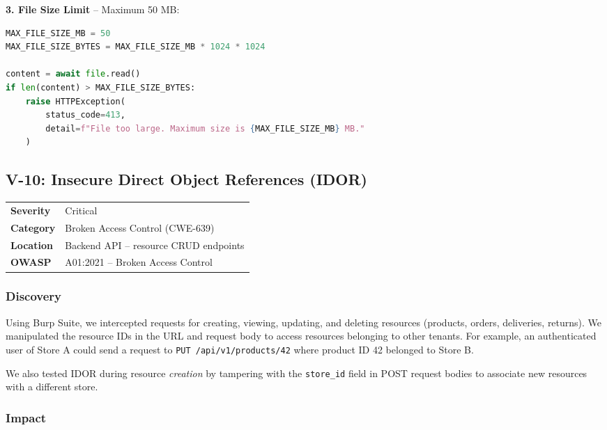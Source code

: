 \documentclass[12pt,a4paper]{article}
\begin{document}
\textbf{3. File Size Limit} -- Maximum 50 MB:

\begin{lstlisting}[language=Python, caption={File size enforcement}]
MAX_FILE_SIZE_MB = 50
MAX_FILE_SIZE_BYTES = MAX_FILE_SIZE_MB * 1024 * 1024

content = await file.read()
if len(content) > MAX_FILE_SIZE_BYTES:
    raise HTTPException(
        status_code=413,
        detail=f"File too large. Maximum size is {MAX_FILE_SIZE_MB} MB."
    )
\end{lstlisting}

\subsection{V-10: Insecure Direct Object References (IDOR)}

\begin{table}[H]
\centering
\begin{tabularx}{\textwidth}{lX}
\toprule
\textbf{Severity} & \textcolor{critical}{Critical} \\
\textbf{Category} & Broken Access Control (CWE-639) \\
\textbf{Location} & Backend API -- resource CRUD endpoints \\
\textbf{OWASP} & A01:2021 -- Broken Access Control \\
\bottomrule
\end{tabularx}
\end{table}

\subsubsection{Discovery}

Using Burp Suite, we intercepted requests for creating, viewing, updating, and deleting resources (products, orders, deliveries, returns). We manipulated the resource IDs in the URL and request body to access resources belonging to other tenants. For example, an authenticated user of Store A could send a request to \texttt{PUT /api/v1/products/42} where product ID 42 belonged to Store B.

We also tested IDOR during resource \textit{creation} by tampering with the \texttt{store\_id} field in POST request bodies to associate new resources with a different store.

\subsubsection{Impact}
\end{document}
